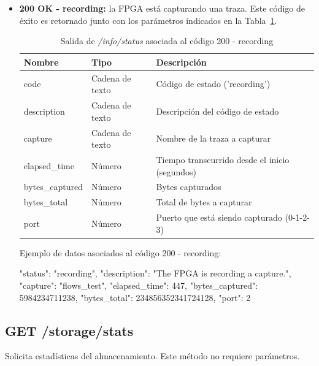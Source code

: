 \begin{itemize}
\item{\textbf{200 OK - recording:} la \gls{FPGA} está capturando una \gls{traza}.
Este código de éxito es retornado junto con los parámetros indicados en la Tabla~\ref{extra:api:infostatus:recording}.
\begin{table}[H]
\centering
\begin{tabular}{|l|l|l|}
\hline
\rowcolor[HTML]{F5F5F5}
\textbf{Nombre}  & \textbf{Tipo}   & \textbf{Descripción}                            \\ \hline
code             & Cadena de texto & Código de estado ('recording')                  \\ \hline
description      & Cadena de texto & Descripción del código de estado                \\ \hline
capture          & Cadena de texto & Nombre de la \gls{traza} a capturar             \\ \hline
elapsed\_time    & Número          & Tiempo transcurrido desde el inicio (segundos)  \\ \hline
bytes\_captured  & Número          & Bytes capturados                                \\ \hline
bytes\_total     & Número          & Total de bytes a capturar                       \\ \hline
port             & Número          & Puerto que está siendo capturado (0-1-2-3)      \\ \hline
\end{tabular}
\caption{Salida de \textit{/info/status} asociada al código 200 - recording}
\label{extra:api:infostatus:recording}
\end{table}
\begin{minipage}{\textwidth}
Ejemplo de datos asociados al código 200 - recording:

\begin{code}[language=json]
{
  "status": "recording",
  "description": "The FPGA is recording a capture.",
  "capture": "flows_test",
  "elapsed_time": 447,
  "bytes_captured": 5984234711238,
  "bytes_total": 234856352341724128,
  "port": 2
}
\end{code}
\end{minipage}
}

\end{itemize}

%
%
\subsection{GET /storage/stats}
Solicita estadísticas del almacenamiento.
Este método no requiere parámetros.

